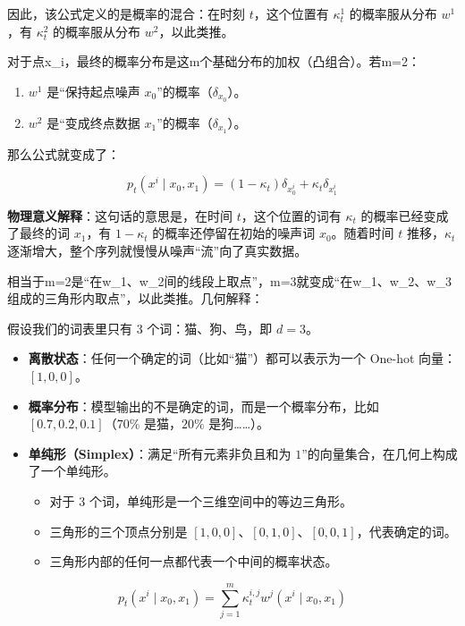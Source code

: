 因此，该公式定义的是概率的混合：在时刻 \(t\)，这个位置有 \(\kappa_t^1\) 的概率服从分布 \(w^1\)，有 \(\kappa_t^2\) 的概率服从分布 \(w^2\)，以此类推。

对于点x\_i，最终的概率分布是这m个基础分布的加权（凸组合）。若m=2：

\begin{enumerate}
\def\labelenumi{\arabic{enumi}.}
\tightlist
\item
  \(w^1\) 是``保持起点噪声 \(x_0\)''的概率（\(\delta_{x_0}\)）。
\item
  \(w^2\) 是``变成终点数据 \(x_1\)''的概率（\(\delta_{x_1}\)）。
\end{enumerate}

那么公式就变成了：

\[
p_t(x^i\mid x_0,x_1)=(1-\kappa_t)\delta_{x_0^i}+\kappa_t\delta_{x_1^i}
\]

\textbf{物理意义解释}：这句话的意思是，在时间 \(t\)，这个位置的词有 \(\kappa_t\) 的概率已经变成了最终的词 \(x_1\)，有 \(1-\kappa_t\) 的概率还停留在初始的噪声词 \(x_0\)。随着时间 \(t\) 推移，\(\kappa_t\) 逐渐增大，整个序列就慢慢从噪声``流''向了真实数据。

相当于m=2是``在w\_1、w\_2间的线段上取点''，m=3就变成``在w\_1、w\_2、w\_3组成的三角形内取点''，以此类推。几何解释：

假设我们的词表里只有 3 个词：猫、狗、鸟，即 \(d=3\)。

\begin{itemize}
\tightlist
\item
  \textbf{离散状态}：任何一个确定的词（比如``猫''）都可以表示为一个 One-hot 向量：\([1,0,0]\)。
\item
  \textbf{概率分布}：模型输出的不是确定的词，而是一个概率分布，比如 \([0.7,0.2,0.1]\)（\(70\%\) 是猫，\(20\%\) 是狗\ldots\ldots）。
\item
  \textbf{单纯形（Simplex）}：满足``所有元素非负且和为 \(1\)''的向量集合，在几何上构成了一个单纯形。

  \begin{itemize}
  \tightlist
  \item
    对于 3 个词，单纯形是一个三维空间中的等边三角形。
  \item
    三角形的三个顶点分别是 \([1,0,0]\)、\([0,1,0]\)、\([0,0,1]\)，代表确定的词。
  \item
    三角形内部的任何一点都代表一个中间的概率状态。
  \end{itemize}
\end{itemize}

\[
p_t(x^i\mid x_0,x_1)=\sum_{j=1}^{m}\kappa_t^{i,j}w^j(x^i\mid x_0,x_1)
\]

